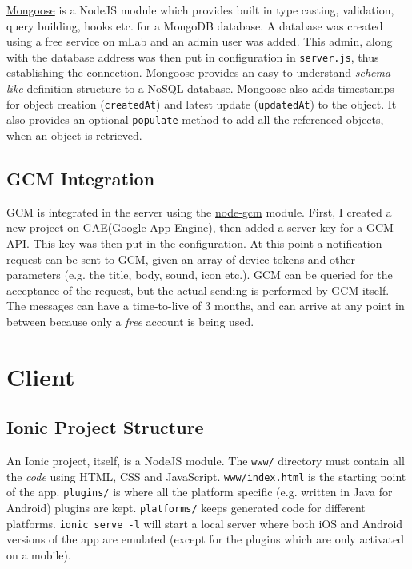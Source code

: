 \href{http://mongoosejs.com}{Mongoose} is a NodeJS module which provides built in type casting, validation, query building, hooks etc. for a MongoDB database. A database was created using a free service on mLab and an admin user was added. This admin, along with the database address was then put in configuration in \texttt{server.js}, thus establishing the connection. Mongoose provides an easy to understand \textit{schema-like} definition structure to a NoSQL database. Mongoose also adds timestamps for object creation (\texttt{createdAt}) and latest update (\texttt{updatedAt}) to the object. It also provides an optional  \texttt{populate} method to add all the referenced objects, when an object is retrieved.

\subsection{GCM Integration}

GCM is integrated in the server using the \href{https://www.npmjs.com/package/node-gcm}{node-gcm} module. First, I created a new project on GAE(Google App Engine), then added a server key for a GCM API. This key was then put in the configuration. At this point a notification request can be sent to GCM, given an array of device tokens and other parameters (e.g. the title, body, sound, icon etc.). GCM can be queried for the acceptance of the request, but the actual sending is performed by GCM itself. The messages can have a time-to-live of 3 months, and can arrive at any point in between because only a \textit{free} account is being used.

\section{Client}

\subsection{Ionic Project Structure}

An Ionic project, itself, is a NodeJS module. The \texttt{www/} directory must contain all the \textit{code} using HTML, CSS and JavaScript. \texttt{www/index.html} is the starting point of the app. \texttt{plugins/} is where all the platform specific (e.g. written in Java for Android) plugins are kept. \texttt{platforms/} keeps generated code for different platforms. \texttt{ionic serve -l} will start a local server where both iOS and Android versions of the app are emulated (except for the plugins which are only activated on a mobile).

